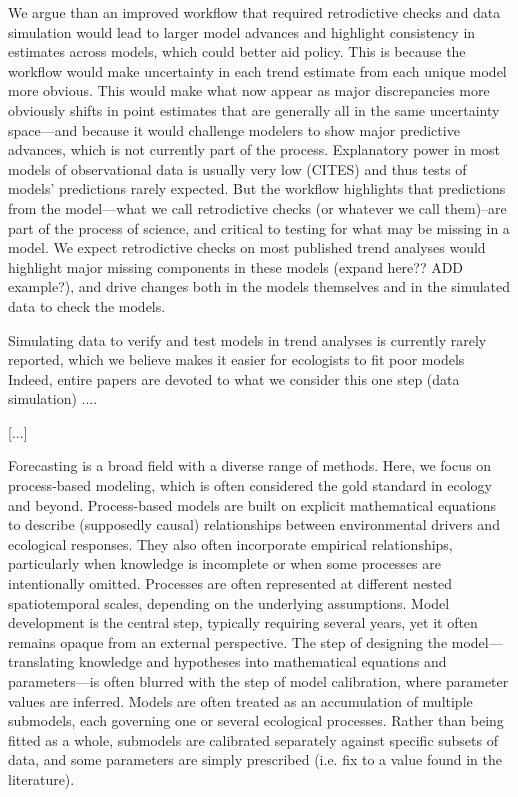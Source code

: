 \documentclass[11pt]{article}
\begin{document}
We argue than an improved workflow that required retrodictive checks and data simulation would lead to larger model advances and highlight consistency in estimates across models, which could better aid policy. This is because the workflow would make uncertainty in each trend estimate from each unique model more obvious. This would make what now appear as major discrepancies  more obviously shifts in point estimates that are generally all in the same uncertainty space---and because it would challenge modelers to show major predictive advances, which is not currently part of the process. Explanatory power in most models of observational data is usually very low (CITES) and thus tests of models' predictions rarely expected. But the workflow highlights that predictions from the model---what we call retrodictive checks (or whatever we call them)--are part of the process of science, and critical to testing for what may be missing in a model. We expect retrodictive checks on most published trend analyses would highlight major missing components in these models (expand here?? ADD example?), and drive changes both in the models themselves and in the simulated data to check the models. 

Simulating data to verify and test models in trend analyses is currently rarely reported, which we believe makes it easier for ecologists to fit poor models 
Indeed, entire papers are devoted to what we consider this one step (data simulation) ....




[...]

Forecasting is a broad field with a diverse range of methods. Here, we focus on process-based modeling, which is often considered the gold standard in ecology and beyond. Process-based models are built on explicit mathematical equations to describe (supposedly causal) relationships between environmental drivers and ecological responses. They also often incorporate empirical relationships, particularly when knowledge is incomplete or when some processes are intentionally omitted. Processes are often represented at different nested spatiotemporal scales, depending on the underlying assumptions. Model development is the central step, typically requiring several years, yet it often remains opaque from an external perspective. The step of designing the model---translating knowledge and hypotheses into mathematical equations and parameters---is often blurred with the step of model calibration, where parameter values are inferred. Models are often treated as an accumulation of multiple submodels, each governing one or several ecological processes. Rather than being fitted as a whole, submodels are calibrated separately against specific subsets of data, and some parameters are simply prescribed (i.e. fix to a value found in the literature).
\end{document}
